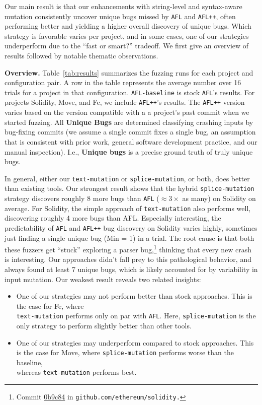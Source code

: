 Our main result is that our enhancements with string-level and syntax-aware
mutation consistently uncover unique bugs missed by \texttt{AFL} and
\texttt{AFL++}, often performing better and yielding a higher overall discovery
of unique bugs. Which strategy is favorable varies per project, and in some
cases, one of our strategies underperform due to the ``fast or smart?''
tradeoff. We first give an overview of results followed by notable
thematic observations.

\noindent \textbf{Overview.} Table~\ref{tab:results} summarizes the fuzzing
runs for each project and configuration pair. A row in the table represents the
average number over 16 trials for a project in that configuration.
\texttt{AFL-baseline} is stock \texttt{AFL}'s results. For projects Solidity,
Move, and Fe, we include \texttt{AFL++}'s results. The \texttt{AFL++} version
varies based on the version compatible with a a project's past commit when we
started fuzzing. All \textbf{Unique Bugs} are determined classifying crashing
inputs by bug-fixing commits (we assume a single commit fixes a single bug, an
assumption that is consistent with prior
work\cite{semantic-crash-bucketing,swarm-paper}, general software development
practice, and our manual inspection). I.e., \textbf{Unique bugs} is a precise
ground truth of truly unique bugs.

In general, either our \texttt{text-mutation} or \texttt{splice-mutation}, or
both, does better than existing tools. Our strongest result shows that the
hybrid \texttt{splice-mutation} strategy discovers roughly 8 more bugs than
\texttt{AFL} ($\approx3\times$ as many) on Solidity on average. For Solidity,
the simple approach of \texttt{text-mutation} also performs well, discovering
roughly 4 more bugs than AFL. Especially interesting, the predictability of
\texttt{AFL} and \texttt{AFL++} bug discovery on Solidity varies highly,
sometimes just finding a single unique bug (Min = 1) in a trial. The root cause
is that both these fuzzers get ``stuck'' exploring a parser
bug,\footnote{Commit
\href{https://github.com/ethereum/solidity/commit/0b9c842656c644c209280e5f570f94dee77a1606}{0b9c84}
in \texttt{github.com/ethereum/solidity.}} thinking that every new crash is
interesting. Our approaches didn't fall prey to this pathological behavior, and
always found at least 7 unique bugs, which is likely accounted for by
variability in input mutation. Our weakest result reveals two related insights:

\begin{itemize}
\item One of our strategies may not perform better than stock approaches. This is the case for Fe, where \\ \texttt{text-mutation} performs only on par with \texttt{AFL}. Here, \texttt{splice-mutation} is the only strategy to perform slightly better than other tools.
\item One of our strategies may underperform compared to stock approaches. This is the case for Move, where \texttt{splice-mutation} performs worse than the baseline, \\ whereas \texttt{text-mutation} performs best.
\end{itemize}

